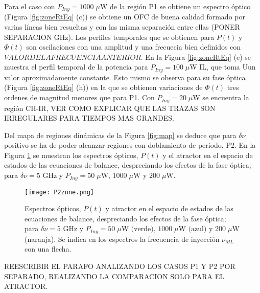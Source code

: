 		Para el caso con $P_{Iny} = 1000\;\mu$W de la región P1 se obtiene un espectro óptico (Figura \ref{fig:zoneRtEq} (c)) se obtiene un OFC de buena calidad formado por varias líneas bien resueltas y con las misma separación entre ellas (PONER SEPARACION GHz). Los perfiles temporales que se obtienen para $P(t)$ y $\Phi(t)$ son oscilaciones con una amplitud y una frecuecia bien definidos con $VALOR DE LA FRECUENCIA ANTERIOR$. En la Figura \ref{fig:zoneRtEq} (e)  se muestra el perfil temporal de la potencia para $P_{Iny} = 100\;\mu$W IL, que toma Uun valor aproximadamente constante. Esto mismo se observa para su fase óptica (Figura \ref{fig:zoneRtEq} (h)) en la que se obtienen variaciones de $\Phi(t)$ tres ordenes de magnitud menores que para P1. Con $P_{Iny} = 20\;\mu$W se encuentra la región CH-IR, VER COMO EXPLICAR QUE LAS TRAZAS SON IRREGULARES PARA TIEMPOS MAS GRANDES.

		Del mapa de regiones dinámicas de la Figura \ref{fig:map} se deduce que para $\delta\nu$ positivo se ha de poder alcanzar regiones con doblamiento de periodo, P2. En la Figura \ref{fig:P2zone} se muestran los espectros ópticos, $P(t)$ y el atractor en el espacio de estados de las ecuaciones de balance, despreciando los efectos de la fase óptica; para $\delta\nu = 5$ GHz y $P_{Iny} = 50\;\mu \textrm{W, } 1000\;\mu\textrm{W y } 200\;\mu$W.

			\begin{figure}[H]
				\centering
				\texttt{[image: P2zone.png]}
				\caption{\label{fig:P2zone}Espectros ópticos, $P(t)$ y atractor en el espacio de estados de las ecuaciones de balance, despreciando los efectos de la fase óptica; para $\delta\nu = 5$ GHz y $P_{Iny} = 50\;\mu \textrm{W (verde), } 1000\;\mu\textrm{W (azul) y } 200\;\mu$W (naranja). Se indica en los espectros la frecuencia de inyección $\nu_{ML}$ con una flecha.}	
			\end{figure}

		REESCRIBIR EL PARAFO ANALIZANDO LOS CASOS P1 Y P2 POR SEPARADO, REALIZANDO LA COMPARACION SOLO PARA EL ATRACTOR.

